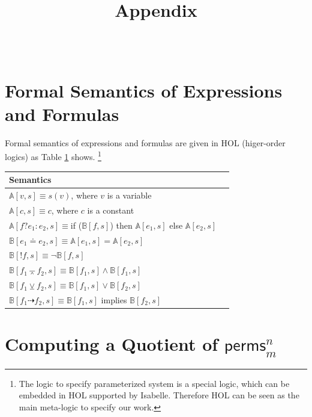 \documentclass{llncs}
\def \andc {\barwedge }
\def \negc {!}
\def \orc {\veebar }
\begin{document}
\title{ Appendix }
\author{~}
\authorrunning{~}
\institute{~}

\maketitle

\section{Formal Semantics of Expressions and Formulas}

Formal semantics of expressions and formulas are given in HOL (higer-order logics) as Table \ref{table-semantics-exp-formula} shows. \footnote{The  logic to specify parameterized system is a special logic, which can be embedded in HOL supported by Isabelle. Therefore HOL can be seen as the main meta-logic to specify our work.}

\begin{table}[h] \label{table-semantics-exp-formula}
\center\begin{tabular}{|l|l|}
  \hline
   Semantics \\ \hline
  $\mathbb{A}[v,s]\equiv s(v)$, where  $v$ is a variable\\
    $\mathbb{A}[c,s]\equiv c$, where  $c$ is a constant\\
   $\mathbb{A}[f?e_1:e_2,s]\equiv$if ($\mathbb{B}[f,s]$) then $\mathbb{A}[e_1,s]$ else $\mathbb{A}[e_2,s]$ \\
  $\mathbb{B}[ e_1\doteq e_2,s]\equiv   \mathbb{A}[e_1,s]=\mathbb{A}[e_2,s]$  \\
  $\mathbb{B}[\negc f,s]\equiv \neg \mathbb{B}[f,s]$ \\
  $\mathbb{B}[f_1\andc f_2,s]\equiv \mathbb{B}[f_1,s] \land \mathbb{B}[f_1,s]$ \\
  $\mathbb{B}[f_1\orc f_2,s]\equiv \mathbb{B}[f_1,s] \vee \mathbb{B}[f_2,s]$ \\
 $\mathbb{B}[f_1\dashrightarrow f_2,s]\equiv \mathbb{B}[f_1,s]$  implies $\mathbb{B}[f_2,s]$ \\
  \hline
\end{tabular}
\end{table}


\section{Computing a Quotient of $\mathsf{perms}_{m}^{n}$}
\end{document}
